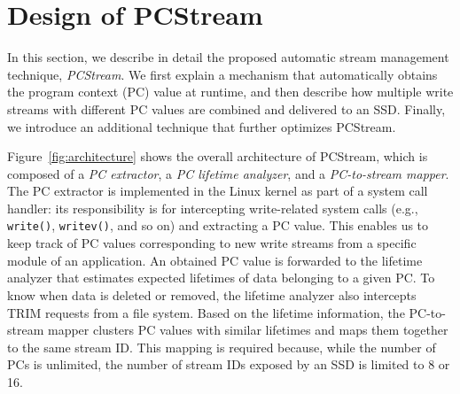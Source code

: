 \section{Design of PCStream}
In this section, we describe in detail the proposed automatic stream management
technique, \textit{PCStream}.  We first explain a mechanism that automatically
obtains the program context (PC) value at runtime, and then describe how
multiple write streams with different PC values are combined and delivered to
an SSD. Finally, we introduce an additional technique that further optimizes
PCStream.


Figure~\ref{fig:architecture} shows the overall architecture of PCStream, which
is composed of a \textit{PC extractor}, a \textit{PC lifetime analyzer}, and a
\textit{PC-to-stream mapper}.  The PC extractor is implemented in the Linux
kernel as part of a system call handler: its responsibility is for intercepting
write-related system calls (e.g., \texttt{write()}, \texttt{writev()}, and so
on) and extracting a PC value.  This enables us to keep track of PC values
corresponding to new write streams from a specific module of an application. An
obtained PC value is forwarded to the lifetime analyzer that estimates expected
lifetimes of data belonging to a given PC. To know when data is deleted or
removed, the lifetime analyzer also intercepts TRIM requests from a file
system.  Based on the lifetime information, the PC-to-stream mapper clusters PC
values with similar lifetimes and maps them together to the same stream ID.
This mapping is required because, while the number of PCs is unlimited, the
number of stream IDs exposed by an SSD is limited to 8 or 16.


